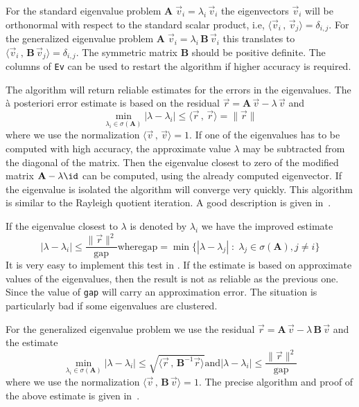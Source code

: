 \documentclass[11pt]{article}
\begin{document}
For the standard eigenvalue problem $\mathbf{A}\;\vec v_i = \lambda_i\, \vec
v_i$ the eigenvectors $\vec v_i$ will be orthonormal with respect to the
standard scalar product, i.e, $\langle \vec v_i\,,\,\vec v_j\rangle
=\delta_{i,j}$. For the generalized eigenvalue problem 
$\mathbf{A}\;\vec v_i = \lambda_i\, \mathbf{B}\,\vec v_i$ this translates to
$\langle \vec v_i\,,\,\mathbf{B}\,\vec v_j\rangle=\delta_{i,j}$. The symmetric
matrix \textbf{B} should be positive definite. The columns of \texttt{Ev} can
be used to restart the algorithm if higher accuracy is required.

The algorithm will return reliable estimates for the errors in the eigenvalues.
The \`a posteriori error estimate is based on the
residual $\vec r = \mathbf{A}\,\vec v -\lambda\,\vec v$ and
\[ \min_{\lambda_i\in\sigma(\mathbf{A})}|\lambda-\lambda_i|\leq 
  \langle \vec r\,,\,\vec r\rangle=\|\vec r\|\]
where we use the normalization $\langle \vec v\,,\,\vec v\rangle =1$.
If one of the eigenvalues has to be computed with high accuracy, the
approximate value $\lambda$ may be subtracted from the diagonal of the matrix.
Then the eigenvalue closest to zero of the modified matrix
$\mathbf{A}-\lambda\id$ can be computed, using the already computed
eigenvector. If the eigenvalue is isolated the algorithm will converge very
quickly. This algorithm is similar to the Rayleigh 
 quotient iteration. A good description is
given in~\cite{GoluVanLoan96}.
\medskip

If the eigenvalue closest to $\lambda$ is denoted by $\lambda_i$ we have
the improved estimate
\[ |\lambda-\lambda_i|\leq  \dfrac{\|\vec r\|^2}{\mbox{gap}}\text{where}
 \mbox{gap}=\min\{|\lambda-\lambda_j|\;:\;
  \lambda_j\in\sigma(\mathbf{A}),j\neq i\} \]
It is very easy to implement this test in \Octave{}. If the estimate is
based on approximate values of the eigenvalues, then the result is not as
reliable as the previous one. Since the value of \texttt{gap} will carry an
approximation error. The situation is particularly bad if some eigenvalues are
clustered.

\bigskip

For the generalized eigenvalue problem 
we use the residual
$\vec r = \mathbf{A}\,\vec v -\lambda\,\mathbf{B}\,\vec v$
and the estimate
\[ \min_{\lambda_i\in\sigma(\mathbf{A})}|\lambda-\lambda_i|\leq 
  \sqrt{\langle \vec r\,,\,\mathbf{B}^{-1}\vec r\rangle}\text{and}
|\lambda-\lambda_i|\leq  \dfrac{\|\vec r\|^2}{\mbox{gap}}\]
where we use the normalization 
$\langle \vec v\,,\,\mathbf{B}\,\vec v\rangle =1$.
The precise algorithm and proof of the above estimate is given
in~\cite{VarFem}.
\end{document}
